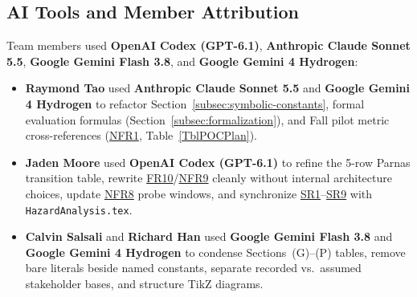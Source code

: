 \documentclass[11pt]{article}
\begin{document}
\subsection*{AI Tools and Member Attribution}
Team members used \textbf{OpenAI Codex (GPT-6.1)}, \textbf{Anthropic Claude Sonnet 5.5}, \textbf{Google Gemini Flash 3.8}, and \textbf{Google Gemini 4 Hydrogen}:
\begin{itemize}[leftmargin=*, noitemsep]
    \item \textbf{Raymond Tao} used \textbf{Anthropic Claude Sonnet 5.5} and \textbf{Google Gemini 4 Hydrogen} to refactor Section~\ref{subsec:symbolic-constants}, formal evaluation formulas (Section~\ref{subsec:formalization}), and Fall pilot metric cross-references (\hyperref[NFR1]{NFR1}, Table~\ref{TblPOCPlan}).
    \item \textbf{Jaden Moore} used \textbf{OpenAI Codex (GPT-6.1)} to refine the 5-row Parnas transition table, rewrite \hyperref[FR10]{FR10}/\hyperref[NFR9]{NFR9} cleanly without internal architecture choices, update \hyperref[NFR8]{NFR8} probe windows, and synchronize \hyperref[SR1]{SR1}--\hyperref[SR9]{SR9} with \texttt{HazardAnalysis.tex}.
    \item \textbf{Calvin Salsali} and \textbf{Richard Han} used \textbf{Google Gemini Flash 3.8} and \textbf{Google Gemini 4 Hydrogen} to condense Sections~(G)--(P) tables, remove bare literals beside named constants, separate recorded vs.\ assumed stakeholder bases, and structure TikZ diagrams.
\end{itemize}
\end{document}
